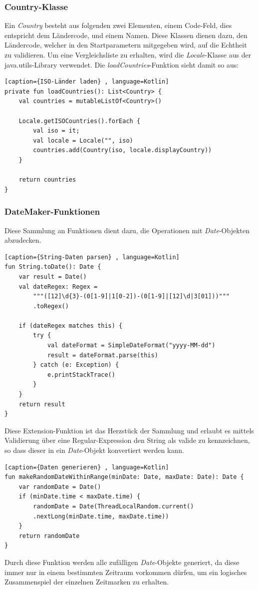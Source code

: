 \subsubsection{Country-Klasse}
Ein \textit{Country} besteht aus folgenden zwei Elementen, einem Code-Feld, dies entspricht dem Ländercode, und einem Namen. Diese Klassen dienen dazu, den Ländercode, welcher in den Startparametern mitgegeben wird, auf die Echtheit zu validieren. Um eine Vergleichsliste zu erhalten, wird die \textit{Locale}-Klasse aus der java.utils-Library verwendet.
\newpage
Die \textit{loadCountries}-Funktion  sieht damit so aus:
\begin{lstlisting}[caption={ISO-Länder laden} , language=Kotlin]
private fun loadCountries(): List<Country> {
    val countries = mutableListOf<Country>()

    Locale.getISOCountries().forEach {
        val iso = it;
        val locale = Locale("", iso)
        countries.add(Country(iso, locale.displayCountry))
    }

    return countries
}
\end{lstlisting}
\vspace{4mm}\par

\subsubsection{DateMaker-Funktionen}
Diese Sammlung an Funktionen dient dazu, die Operationen mit \textit{Date}-Objekten abzudecken.
\begin{lstlisting}[caption={String-Daten parsen} , language=Kotlin]
fun String.toDate(): Date {
    var result = Date()
    val dateRegex: Regex = 
        """([12]\d{3}-(0[1-9]|1[0-2])-(0[1-9]|[12]\d|3[01]))"""
        .toRegex()

    if (dateRegex matches this) {
        try {
            val dateFormat = SimpleDateFormat("yyyy-MM-dd")
            result = dateFormat.parse(this)
        } catch (e: Exception) {
            e.printStackTrace()
        }
    }
    return result
}
\end{lstlisting}
\vspace{4mm}\par
Diese Extension-Funktion ist das Herzstück der Sammlung und erlaubt es mittels Validierung über eine Regular-Expression den String als valide zu kennzeichnen, so dass dieser in ein \textit{Date}-Objekt konvertiert werden kann.
\begin{lstlisting}[caption={Daten generieren} , language=Kotlin]
fun makeRandomDateWithinRange(minDate: Date, maxDate: Date): Date {
    var randomDate = Date()
    if (minDate.time < maxDate.time) {
        randomDate = Date(ThreadLocalRandom.current()
        .nextLong(minDate.time, maxDate.time))
    }
    return randomDate
}
\end{lstlisting}
\vspace{4mm}\par
Durch diese Funktion werden alle zufälligen \textit{Date}-Objekte generiert, da diese immer nur in einem bestimmten Zeitraum vorkommen dürfen, um ein logisches Zusammenspiel der einzelnen Zeitmarken zu erhalten.

